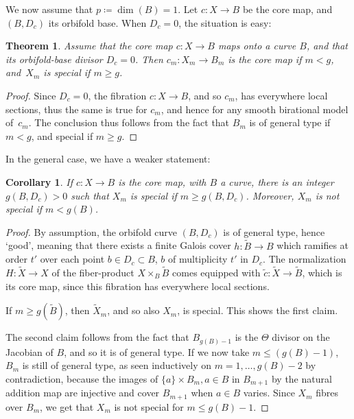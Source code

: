 \documentclass[JEP,XML,SOM,Unicode, NoEqCountersInSection,NoFloatCountersInSection,published]{cedram}
\theoremstyle{theorem}
\newtheorem{theorem}{Theorem}
\newtheorem{corollary}[proposition]{Corollary}
\theoremstyle{definition}
\begin{document}
We now assume that $p\coloneqq \dim(B)=1$. Let $c:X\to B$ be the core map, and $(B,D_c)$ its orbifold base. When $D_c=0$, the situation is easy:

\begin{theorem} \label{thmcorecurve} Assume that the core map $c:X\to B$ maps onto a curve $B$, and that its orbifold-base divisor $D_c=0$. Then $c_m:X_m\to B_m$ is the core map if $m<g$, and~$X_m$ is special if $m\geq g$.
\end{theorem}

\begin{proof} Since $D_c=0$, the fibration $c:X\to B$, and so $c_m$, has everywhere local sections, thus the same is true for $c_m$, and hence for any smooth birational model of~$c_m$. The conclusion thus follows from the fact that $B_m$ is of general type if $m<g$, and special if $m\geq g$.\end{proof}

In the general case, we have a weaker statement:

\begin{corollary}\label{corg'} If $c:X\to B$ is the core map, with $B$ a curve, there is an integer $g(B,D_c)>0$ such that $X_m$ is special if $m\geq g(B,D_c)$. Moreover, $X_m$ is not special if $m<g(B)$.\end{corollary}

\begin{proof} By assumption, the orbifold curve $(B,D_c)$ is of general type, hence `good', meaning that there exists a finite Galois cover $h:\tilde{B}\to B$ which ramifies at order $t'$ over each point $b\in D_c\subset B$, $b$ of multiplicity $t'$ in $D_c$. The normalization $H:\tilde{X}\to X$ of the fiber-product $X\times_B \tilde{B}$ comes equipped with $\tilde{c}:\tilde{X}\to \tilde{B}$, which is its core map, since this fibration has everywhere local sections.

If $m\geq g(\tilde{B})$, then $\tilde{X}_m$, and so also $X_m$, is special. This shows the first claim.

The second claim follows from the fact that $B_{g(B)-1}$ is the $\Theta$ divisor on the Jacobian of $B$, and so it is of general type. If we now take $m\leq (g(B)-1)$, $B_m$ is still of general type, as seen inductively on $m=1,\dots, g(B)-2$ by contradiction, because the images of $\{a\}\times B_m, a\in B$ in $B_{m+1}$ by the natural addition map are injective and cover $B_{m+1}$ when $a\in B$ varies. Since $X_m$ fibres over $B_m$, we get that $X_m$ is not special for $m\leq g(B)-1$. \end{proof}
\end{document}
